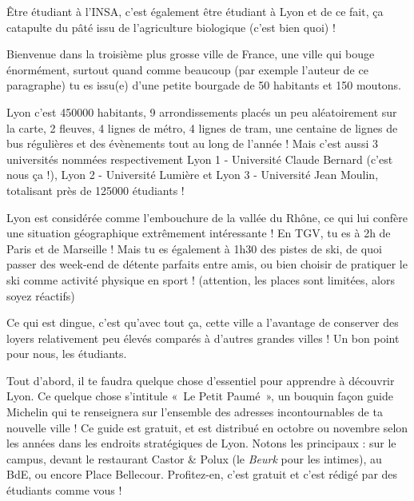 Être étudiant à l'INSA, c'est également être étudiant à Lyon et de ce fait, ça
catapulte du pâté issu de l'agriculture biologique (c'est bien quoi) !

\vspace{1em}

Bienvenue dans la troisième plus grosse ville de France, une ville
qui bouge énormément, surtout quand comme beaucoup (par exemple l'auteur de ce
paragraphe) tu es issu(e) d'une petite bourgade de 50 habitants et 150 moutons.

\vspace{1em}

Lyon c'est 450000 habitants, 9 arrondissements placés un peu aléatoirement sur
la carte, 2 fleuves, 4 lignes de métro, 4 lignes de tram, une centaine de lignes
de bus régulières et des évènements tout au long de l'année ! Mais c'est aussi 3
universités nommées respectivement Lyon 1 - Université Claude Bernard (c'est
nous ça !), Lyon 2 - Université Lumière et Lyon 3 - Université Jean
Moulin, totalisant près de 125000 étudiants !

\vspace{1em}

Lyon est considérée comme l'embouchure de la vallée du Rhône, ce qui lui confère
une situation géographique extrêmement intéressante ! En TGV, tu es
à 2h de Paris et de Marseille ! Mais tu es également à 1h30 des pistes de ski,
de quoi passer des week-end de détente parfaits entre amis, ou bien choisir de
pratiquer le ski comme activité physique en sport ! (attention, les places sont limitées, alors soyez réactifs)

\vspace{1em}

Ce qui est dingue, c'est qu'avec tout ça, cette ville a l'avantage de conserver
des loyers relativement peu élevés comparés à d'autres grandes villes ! Un bon point pour nous, les étudiants.

\vspace{1em}

Tout d'abord, il te faudra quelque chose d'essentiel pour apprendre à découvrir
Lyon. Ce quelque chose s'intitule «~Le Petit Paumé~», un bouquin façon guide
Michelin qui te renseignera sur l'ensemble des adresses incontournables de ta
nouvelle ville ! Ce guide est gratuit, et est distribué en octobre ou novembre
selon les années dans les endroits stratégiques de Lyon. Notons les
principaux : sur le campus, devant le restaurant Castor \& Polux (le \emph{Beurk} pour les
intimes), au BdE, ou encore Place Bellecour. Profitez-en, c'est gratuit
et c'est rédigé par des étudiants comme vous !

